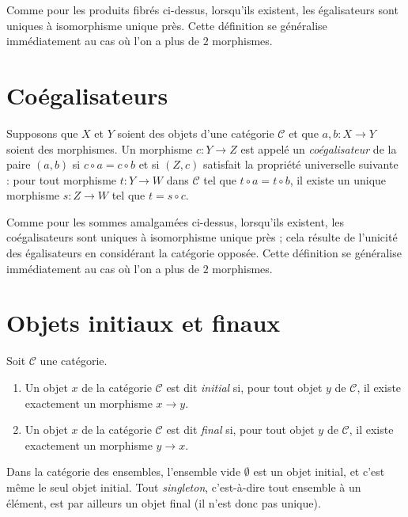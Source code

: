 \noindent
Comme pour les produits fibrés ci-dessus, lorsqu'ils existent, les
égalisateurs sont uniques à isomorphisme unique près. Cette définition
se généralise immédiatement au cas où l'on a plus de $2$ morphismes.

\section{Coégalisateurs}
\label{section-coequalizers}

\begin{definition}
\label{definition-coequalizers}
Supposons que $X$ et $Y$ soient des objets d'une catégorie $\mathcal{C}$
et que $a, b : X \to Y$ soient des morphismes. Un morphisme
$c : Y \to Z$ est appelé un {\it coégalisateur} de la paire $(a, b)$ si
$c \circ a = c \circ b$ et si $(Z, c)$ satisfait la propriété universelle
suivante : pour tout morphisme $t : Y \to W$
dans $\mathcal{C}$ tel que $t \circ a = t \circ b$, il existe
un unique morphisme $s : Z \to W$ tel que $t = s \circ c$.
\end{definition}

\noindent
Comme pour les sommes amalgamées ci-dessus, lorsqu'ils existent, les
coégalisateurs sont uniques à isomorphisme unique près ; cela résulte
de l'unicité des égalisateurs en considérant la catégorie opposée.
Cette définition se généralise immédiatement au cas où l'on a plus de
$2$ morphismes.

\section{Objets initiaux et finaux}
\label{section-initial-final}

\begin{definition}
\label{definition-initial-final}
Soit $\mathcal{C}$ une catégorie.
\begin{enumerate}
\item Un objet $x$ de la catégorie $\mathcal{C}$ est dit
{\it initial} si, pour tout objet $y$ de $\mathcal{C}$,
il existe exactement un morphisme $x \to y$.
\item Un objet $x$ de la catégorie $\mathcal{C}$ est dit
{\it final} si, pour tout objet $y$ de $\mathcal{C}$,
il existe exactement un morphisme $y \to x$.
\end{enumerate}
\end{definition}

\noindent
Dans la catégorie des ensembles, l'ensemble vide $\emptyset$ est un
objet initial, et c'est même le seul objet initial.
Tout {\it singleton}, c'est-à-dire tout ensemble à un élément,
est par ailleurs un objet final (il n'est donc pas unique).




